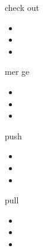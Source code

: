 \documentclass[aspectratio=1610,20pt,xcolor=pdftex,dvipsnames,table,handout]{beamer}
\begin{document}
		\begin{frame} [t,plain]									
											
			\begin{block} {		check out		}				
			\setlength{\leftmargini}{1em}								
			\begin{itemize}								
				\item							
				\item							
				\item							
			\end{itemize}								
			\end{block}								
											
		\end{frame}									

		\begin{frame} [t,plain]									
											
			\begin{block} {		mer ge		}				
			\setlength{\leftmargini}{1em}								
			\begin{itemize}								
				\item							
				\item							
				\item							
			\end{itemize}								
			\end{block}								
											
		\end{frame}									

		\begin{frame} [t,plain]									
											
			\begin{block} {		push		}				
			\setlength{\leftmargini}{1em}								
			\begin{itemize}								
				\item							
				\item							
				\item							
			\end{itemize}								
			\end{block}								
											
		\end{frame}									


		\begin{frame} [t,plain]									
											
			\begin{block} {		pull		}				
			\setlength{\leftmargini}{1em}								
			\begin{itemize}								
				\item							
				\item							
				\item							
			\end{itemize}								
			\end{block}								
											
		\end{frame}									
\end{document}

